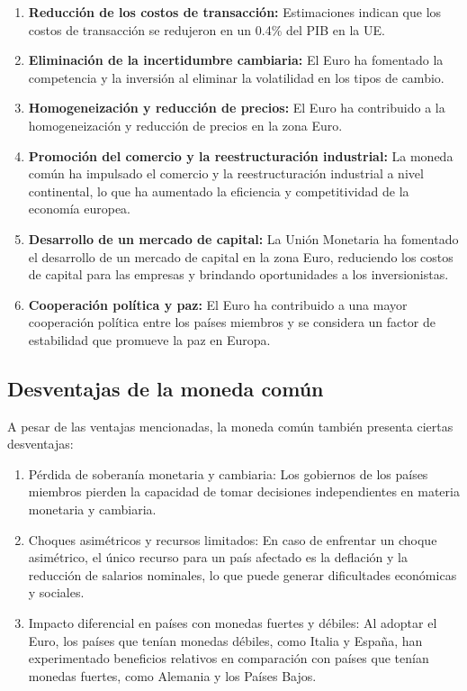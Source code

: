 \documentclass[
  a4paper,
]{article}
\begin{document}
\begin{enumerate}
\def\labelenumi{\arabic{enumi}.}
\item
  \textbf{Reducción de los costos de transacción:} Estimaciones indican
  que los costos de transacción se redujeron en un 0.4\% del PIB en la
  UE.
\item
  \textbf{Eliminación de la incertidumbre cambiaria:} El Euro ha
  fomentado la competencia y la inversión al eliminar la volatilidad en
  los tipos de cambio.
\item
  \textbf{Homogeneización y reducción de precios:} El Euro ha
  contribuido a la homogeneización y reducción de precios en la zona
  Euro.
\item
  \textbf{Promoción del comercio y la reestructuración industrial:} La
  moneda común ha impulsado el comercio y la reestructuración industrial
  a nivel continental, lo que ha aumentado la eficiencia y
  competitividad de la economía europea.
\item
  \textbf{Desarrollo de un mercado de capital:} La Unión Monetaria ha
  fomentado el desarrollo de un mercado de capital en la zona Euro,
  reduciendo los costos de capital para las empresas y brindando
  oportunidades a los inversionistas.
\item
  \textbf{Cooperación política y paz:} El Euro ha contribuido a una
  mayor cooperación política entre los países miembros y se considera un
  factor de estabilidad que promueve la paz en Europa.
\end{enumerate}

\hypertarget{desventajas-de-la-moneda-comuxfan}{%
\subsection{Desventajas de la moneda
común}\label{desventajas-de-la-moneda-comuxfan}}

A pesar de las ventajas mencionadas, la moneda común también presenta
ciertas desventajas:

\begin{enumerate}
\def\labelenumi{\arabic{enumi}.}
\item
  Pérdida de soberanía monetaria y cambiaria: Los gobiernos de los
  países miembros pierden la capacidad de tomar decisiones
  independientes en materia monetaria y cambiaria.
\item
  Choques asimétricos y recursos limitados: En caso de enfrentar un
  choque asimétrico, el único recurso para un país afectado es la
  deflación y la reducción de salarios nominales, lo que puede generar
  dificultades económicas y sociales.
\item
  Impacto diferencial en países con monedas fuertes y débiles: Al
  adoptar el Euro, los países que tenían monedas débiles, como Italia y
  España, han experimentado beneficios relativos en comparación con
  países que tenían monedas fuertes, como Alemania y los Países Bajos.
\end{enumerate}
\end{document}

